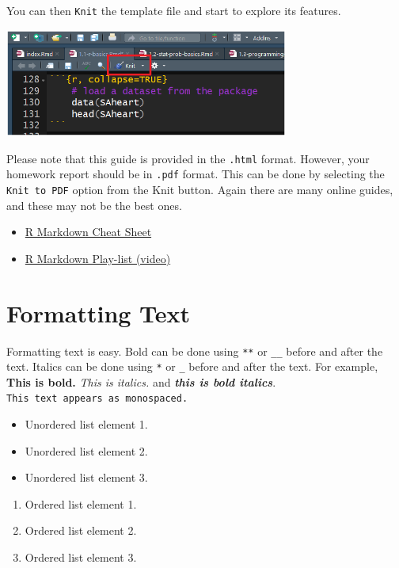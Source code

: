 \documentclass[
]{book}
\providecommand{\tightlist}{%
  \setlength{\itemsep}{0pt}\setlength{\parskip}{0pt}}
\theoremstyle{definition}
\theoremstyle{definition}
\theoremstyle{definition}
\theoremstyle{definition}
\theoremstyle{remark}
\begin{document}
You can then \texttt{Knit} the template file and start to explore its features.

\includegraphics[width=0.7\textwidth,height=\textheight]{images/Knit.png}

Please note that this guide is provided in the \texttt{.html} format. However, your homework report should be in \texttt{.pdf} format. This can be done by selecting the \texttt{Knit\ to\ PDF} option from the Knit button. Again there are many online guides, and these may not be the best ones.

\begin{itemize}
\tightlist
\item
  \href{https://www.rstudio.com/wp-content/uploads/2015/02/rmarkdown-cheatsheet.pdf}{R Markdown Cheat Sheet}
\item
  \href{https://www.youtube.com/playlist?list=PLBgxzZMu3GpNgd07DwmS-2odHtMO6MWGH}{R Markdown Play-list (video)}
\end{itemize}

\hypertarget{formatting-text}{%
\section{Formatting Text}\label{formatting-text}}

Formatting text is easy. Bold can be done using \texttt{**} or \texttt{\_\_} before and after the text. Italics can be done using \texttt{*} or \texttt{\_} before and after the text. For example, \textbf{This is bold.} \emph{This is italics.} and \textbf{\emph{this is bold italics}}. \texttt{This\ text\ appears\ as\ monospaced.}

\begin{itemize}
\tightlist
\item
  Unordered list element 1.
\item
  Unordered list element 2.
\item
  Unordered list element 3.
\end{itemize}

\begin{enumerate}
\def\labelenumi{\arabic{enumi}.}
\tightlist
\item
  Ordered list element 1.
\item
  Ordered list element 2.
\item
  Ordered list element 3.
\end{enumerate}
\end{document}
